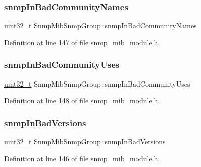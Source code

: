 \subsubsection{\texorpdfstring{snmp\+In\+Bad\+Community\+Names}{snmpInBadCommunityNames}}
{\footnotesize\ttfamily \hyperlink{stdint_8h_a435d1572bf3f880d55459d9805097f62}{uint32\+\_\+t} Snmp\+Mib\+Snmp\+Group\+::snmp\+In\+Bad\+Community\+Names}



Definition at line 147 of file snmp\+\_\+mib\+\_\+module.\+h.

\mbox{\label{structSnmpMibSnmpGroup_a25ad2a7ed5cc593fa0e91cf8ecee60ea}} 
\subsubsection{\texorpdfstring{snmp\+In\+Bad\+Community\+Uses}{snmpInBadCommunityUses}}
{\footnotesize\ttfamily \hyperlink{stdint_8h_a435d1572bf3f880d55459d9805097f62}{uint32\+\_\+t} Snmp\+Mib\+Snmp\+Group\+::snmp\+In\+Bad\+Community\+Uses}



Definition at line 148 of file snmp\+\_\+mib\+\_\+module.\+h.

\mbox{\label{structSnmpMibSnmpGroup_a33f4ee934c30f902620f9150362843cc}} 
\subsubsection{\texorpdfstring{snmp\+In\+Bad\+Versions}{snmpInBadVersions}}
{\footnotesize\ttfamily \hyperlink{stdint_8h_a435d1572bf3f880d55459d9805097f62}{uint32\+\_\+t} Snmp\+Mib\+Snmp\+Group\+::snmp\+In\+Bad\+Versions}



Definition at line 146 of file snmp\+\_\+mib\+\_\+module.\+h.

\mbox{\label{structSnmpMibSnmpGroup_ae3c9cf3b1dbc8d94a384c3067aa4f951}} 
